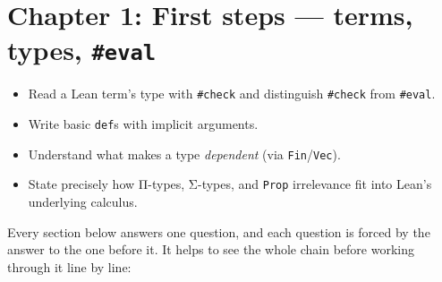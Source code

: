 \chapter{\texorpdfstring{Chapter 1: First steps --- terms, types, \texttt{\#eval}}{Chapter 1: First steps --- terms, types, \#eval}}\label{sec:01-basics:00-index:1}

\begin{learningobjectives}
\begin{itemize}
\tightlist
\item
  Read a Lean term's type with \texttt{\#check} and distinguish \texttt{\#check} from \texttt{\#eval}.
\item
  Write basic \texttt{def}s with implicit arguments.
\item
  Understand what makes a type \emph{dependent} (via \texttt{Fin}/\texttt{Vec}).
\item
  State precisely how Π-types, Σ-types, and \texttt{Prop} irrelevance fit into Lean's underlying calculus.
\end{itemize}
\end{learningobjectives}


Every section below answers one question, and each question is forced by the answer to the one before it. It helps to see the whole chain before working through it line by line:

